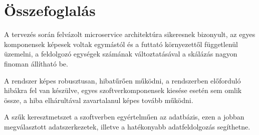\section{Összefoglalás}

A tervezés során felvázolt microservice architektúra sikeresnek bizonyult,
az egyes komponensek képesek voltak egymástól és a futtató környezettől
függetlenül üzemelni, a feldolgozó egységek számának változtatásával
a skálázás nagyon finoman állítható be.

A rendszer képes robusztusan, hibatűrően működni, a rendszerben előforduló
hibákra fel van készülve, egyes szoftverkomponensek kiesése esetén
sem omlik össze, a hiba elhárultával zavartalanul képes tovább működni.

A szűk keresztmetszet a szoftverben egyértelműen az adatbázis, ezen
a jobban megválasztott adatszerkezetek, illetve a hatékonyabb adatfeldolgozás
segíthetne.
